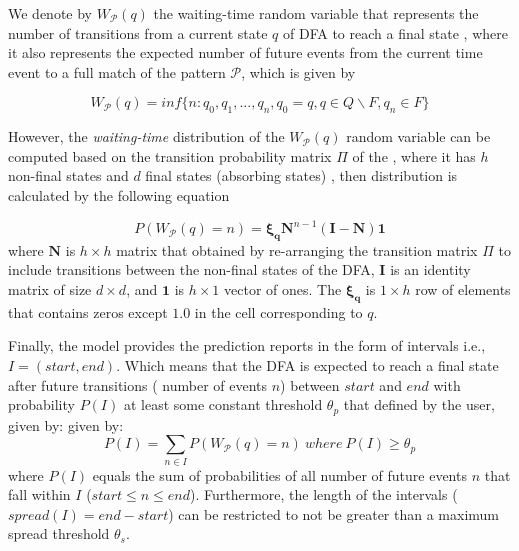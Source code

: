 \par We denote by $W_{\mathcal{P}}(q)$  the waiting-time random variable that represents the
number of transitions from a current state $q$ of DFA to reach a final state \cite{alevizos2017event}, where it also represents the expected number of future events from the current time event to  a full match of the pattern $\mathcal{P}$, which is given by 

\begin{equation*}
W_{\mathcal{P}}(q)=inf\{n: q_{0},q_{1},...,q_{n}, q_{0}=q, q \in Q \backslash F, q_{n} \in F\}
\end{equation*}

However, the \textit{waiting-time} distribution of the $W_{\mathcal{P}}(q)$ random variable can be computed based on the transition probability matrix $\Pi$ of the \pmcmr, where it has $h$ non-final states and $d$ final states (absorbing states) \cite{alevizos2017event}, then distribution is calculated by the following equation 

\begin{equation*}
P(W_{\mathcal{P}}(q)=n)=\boldsymbol{\xi_{q}}\boldsymbol{N}^{n-1}(\boldsymbol{I}-\boldsymbol{N})\boldsymbol{1}
\end{equation*}
where $\boldsymbol{N}$ is $h \times h$ matrix that obtained by re-arranging the transition matrix $\Pi$ to include transitions between the non-final states of the DFA, $\boldsymbol{I}$ is an identity matrix of size $d \times d$, and  $\boldsymbol{1}$ is $h \times 1$ vector of ones. The $\boldsymbol{\xi_{q}}$ is $1 \times h$ row of elements that contains zeros except $1.0$ in the cell corresponding to $q$. 
\par Finally, the model provides the prediction reports in the form of intervals i.e.,  $I=(\mathit{start},\mathit{end})$. Which means that the DFA is expected to reach a final state  after future transitions ( number of events $n$) between $\mathit{start}$ and $\mathit{end}$ with probability $P(I)$ at least some constant threshold $\theta_{p}$ that defined by the user, given by: 
 given by:
\begin{equation*}
P(I)=\sum_{n \in I}{P(W_{\mathcal{P}}(q)=n)}\ where\  P(I) \geq \theta_{p} 
\end{equation*}
where $P(I)$ equals the sum of probabilities of all number of future events $n$ that fall within $I$ ($start\leq n\leq end$). Furthermore, the length of the intervals ($spread(I) = end - start$)  can be restricted to not be greater than a maximum spread threshold $\theta_{s}$.  

